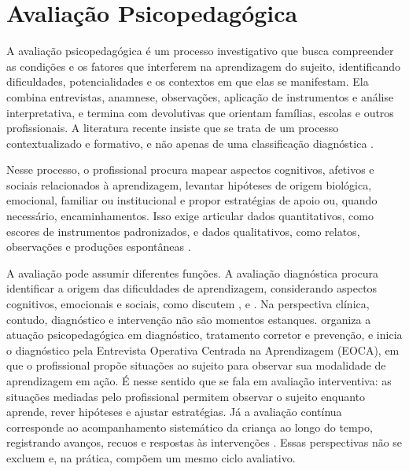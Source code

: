 \section{Avaliação Psicopedagógica}

A avaliação psicopedagógica é um processo investigativo que busca compreender as condições e os fatores que interferem na aprendizagem do sujeito, identificando dificuldades, potencialidades e os contextos em que elas se manifestam. Ela combina entrevistas, anamnese, observações, aplicação de instrumentos e análise interpretativa, e termina com devolutivas que orientam famílias, escolas e outros profissionais. A literatura recente insiste que se trata de um processo contextualizado e formativo, e não apenas de uma classificação diagnóstica \cite{pires2021_para_quem_serve}.

Nesse processo, o profissional procura mapear aspectos cognitivos, afetivos e sociais relacionados à aprendizagem, levantar hipóteses de origem biológica, emocional, familiar ou institucional e propor estratégias de apoio ou, quando necessário, encaminhamentos. Isso exige articular dados quantitativos, como escores de instrumentos padronizados, e dados qualitativos, como relatos, observações e produções espontâneas \cite{Cruz_Batista_de_Souza_dos_Santos_de_Lima_Amorim_de_Andrade_Pires_2023}.

A avaliação pode assumir diferentes funções. A avaliação diagnóstica procura identificar a origem das dificuldades de aprendizagem, considerando aspectos cognitivos, emocionais e sociais, como discutem ,  e . Na perspectiva clínica, contudo, diagnóstico e intervenção não são momentos estanques.  organiza a atuação psicopedagógica em diagnóstico, tratamento corretor e prevenção, e inicia o diagnóstico pela Entrevista Operativa Centrada na Aprendizagem (EOCA), em que o profissional propõe situações ao sujeito para observar sua modalidade de aprendizagem em ação. É nesse sentido que se fala em avaliação interventiva: as situações mediadas pelo profissional permitem observar o sujeito enquanto aprende, rever hipóteses e ajustar estratégias. Já a avaliação contínua corresponde ao acompanhamento sistemático da criança ao longo do tempo, registrando avanços, recuos e respostas às intervenções \cite{Santos_Silva_2020}. Essas perspectivas não se excluem e, na prática, compõem um mesmo ciclo avaliativo.

